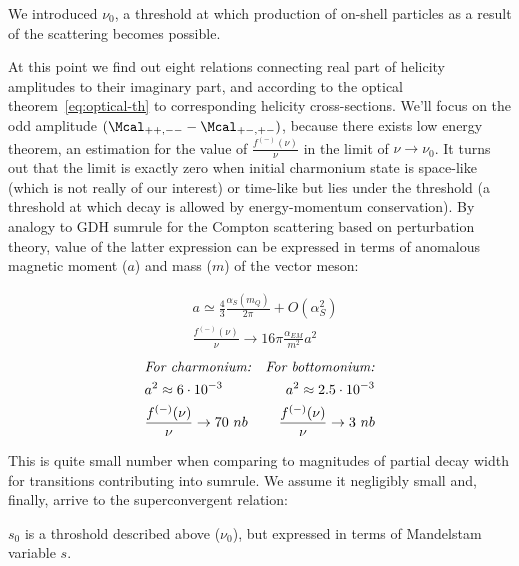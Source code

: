 We introduced $\nu_0$, a threshold at which production of on-shell particles as a result of the scattering becomes possible.

At this point we find out eight relations connecting real part of helicity amplitudes to their imaginary part, and according to the optical theorem~\cref{eq:optical-th} to corresponding helicity cross-sections. We'll focus on the odd amplitude $(\Mcal_{++,--} - \Mcal_{+-,+-})$, because there exists low energy theorem, an estimation for the value of $\frac{f^{(-)}(\nu)}{\nu}$ in the limit of $\nu \rightarrow \nu_0$. It turns out that the limit is exactly zero when initial charmonium state is space-like (which is not really of our interest) or time-like but lies under the threshold (a threshold at which decay is allowed by energy-momentum conservation). By analogy to GDH sumrule for the Compton scattering based on perturbation theory, value of the latter expression can be expressed in terms of anomalous magnetic moment ($a$) and mass ($m$) of the vector meson:

\begin{align}
    &a \simeq \frac{4}{3} \frac{\alpha_S(m_Q)}{2 \pi} + O(\alpha_S^2)\\
    &\frac{f^{(-)}(\nu)}{\nu} \rightarrow 16 \pi \frac{\alpha_{EM}}{m^2} a^2
\end{align}
\begin{align}
    &\text{\textit{For charmonium:}} &\text{\textit{For bottomonium:}} \nonumber \\
    &a^2 \approx 6\cdot10^{-3} &a^2 \approx 2.5\cdot10^{-3} \nonumber \\
    &\frac{f^{(-)}(\nu)}{\nu} \rightarrow 70~nb &\frac{f^{(-)}(\nu)}{\nu} \rightarrow 3~nb \nonumber 
\end{align}

This is quite small number when comparing to magnitudes of partial decay width for transitions contributing into sumrule. We assume it negligibly small and, finally, arrive to the superconvergent relation:

\begin{center}  \end{center}

$s_0$ is a throshold described above ($\nu_0$), but expressed in terms of Mandelstam variable $s$.

